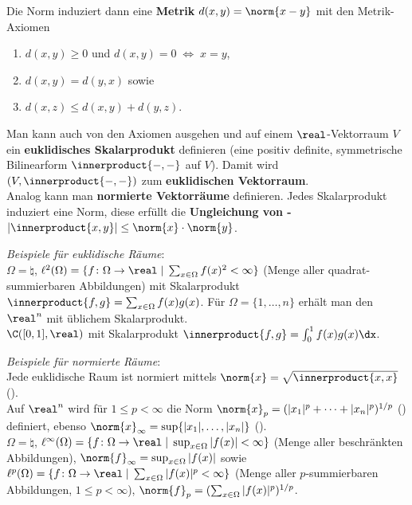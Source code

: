 Die Norm induziert dann eine \textbf{Metrik} $d(x, y) = \norm{x - y}$ mit den
Metrik-Axiomen
\begin{enumerate}[label=(M\arabic*)]
    \item
    $d(x, y) \ge 0$ und $d(x, y) = 0 \;\Leftrightarrow\; x = y$,

    \item
    $d(x, y) = d(y, x)$ sowie

    \item
    $d(x, z) \le d(x, y) + d(y, z)$.
\end{enumerate}

Man kann auch von den Axiomen ausgehen und auf einem $\real$-Vektorraum $V$ ein
\textbf{euklidisches Skalarprodukt} definieren
(eine positiv definite, symmetrische Bilinearform $\innerproduct{-, -}$ auf $V$).
Damit wird $(V, \innerproduct{-, -})$ zum \textbf{euklidischen Vektorraum}. \\
Analog kann man \textbf{normierte Vektorräume} definieren. Jedes Skalarprodukt
induziert eine Norm, diese erfüllt die
\textbf{Ungleichung von -}
$|\innerproduct{x, y}| \le \norm{x} \cdot \norm{y}$.

\emph{Beispiele für euklidische Räume}: \\
$\Omega = \natural$,
$\ell^2(\Omega) = \{f\colon \Omega \rightarrow \real \;|\;
\sum_{x \in \Omega} f(x)^2 < \infty\}$
(Menge aller quadrat-summierbaren Abbildungen)
mit Skalarprodukt
$\innerproduct{f, g} = \sum_{x \in \Omega} f(x)g(x)$.
Für $\Omega = \{1, \dotsc, n\}$ erhält man den
$\real^n$ mit üblichem Skalarprodukt. \\
$\C([0,1], \real)$ mit Skalarprodukt $\innerproduct{f, g} = \int_0^1 f(x)g(x)\dx$.

\emph{Beispiele für normierte Räume}: \\
Jede euklidische Raum ist normiert mittels $\norm{x} = \sqrt{\innerproduct{x, x}}$
(). \\
Auf $\real^n$ wird für $1 \le p < \infty$ die Norm
$\norm{x}_p = (|x_1|^p + \dotsb + |x_n|^p)^{1/p}$ ()
definiert, ebenso $\norm{x}_\infty = \sup\{|x_1|, \dotsc, |x_n|\}$
(). \\
$\Omega = \natural$,
$\ell^\infty(\Omega) = \{f\colon \Omega \rightarrow \real \;|\;
\sup_{x \in \Omega} |f(x)| < \infty\}$
(Menge aller beschränkten Abbildungen),
$\norm{f}_\infty = \sup_{x \in \Omega} |f(x)|$ sowie
$\ell^p(\Omega) = \{f\colon \Omega \rightarrow \real \;|\;
\sum_{x \in \Omega} |f(x)|^p < \infty\}$
(Menge aller $p$-summierbaren Abbildungen, $1 \le p < \infty$),
$\norm{f}_p = (\sum_{x \in \Omega} |f(x)|^p)^{1/p}$.

